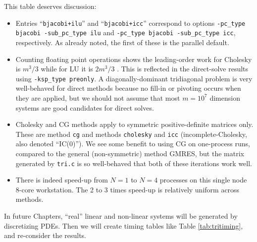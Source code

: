 This table deserves discussion:
\begin{itemize}
\item Entries ``\texttt{bjacobi+ilu}'' and ``\texttt{bjacobi+icc}'' correspond to options \texttt{-pc\_type bjacobi -sub\_pc\_type ilu} and \texttt{-pc\_type bjacobi -sub\_pc\_type icc}, respectively.  As already noted, the first of these is the parallel default.
\item Counting floating point operations shows the leading-order work for Cholesky is $m^3/3$ while for LU it is $2 m^3/3$ \citep{TrefethenBau}.  This is reflected in the direct-solve results using \texttt{-ksp\_type preonly}.  A diagonally-dominant tridiagonal problem is very well-behaved for direct methods because no fill-in or pivoting occurs when they are applied, but we should not assume that most $m=10^7$ dimension systems are good candidates for direct solves.
\item Cholesky and CG methods apply to symmetric positive-definite matrices only.  These are \pKSP method \texttt{cg} and \pPC methods \texttt{cholesky} and \texttt{icc} (incomplete-Cholesky, also denoted ``IC($0$)'').  We see some benefit to using CG on one-process runs, compared to the general (non-symmetric) method GMRES, but the matrix generated by \texttt{tri.c} is so well-behaved that both of these iterations work well.
\item There is indeed speed-up from $N=1$ to $N=4$ processes on this single node 8-core workstation.  The 2 to 3 times speed-up is relatively uniform across methods.
\end{itemize}

In future Chapters, ``real'' linear and non-linear systems will be generated by discretizing PDEs.  Then we will create timing tables like Table \ref{tab:tritiming}, and re-consider the results.

